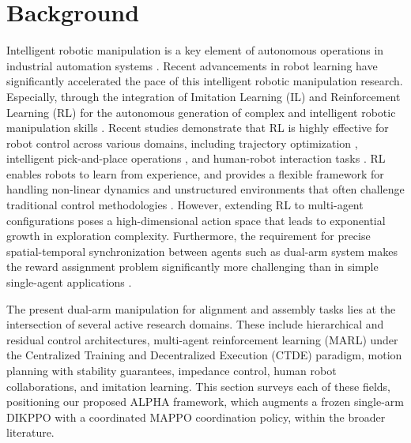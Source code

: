 \documentclass[a4paper,fleqn]{cas-dc}
\begin{document}
\section{Background}
\label{related_work}
Intelligent robotic manipulation is a key element of autonomous operations in industrial automation systems \cite{surya2025iapf}. Recent advancements in robot learning have significantly accelerated the pace of this intelligent robotic manipulation research. Especially, through the integration of Imitation Learning (IL) and Reinforcement Learning (RL) for the autonomous generation of complex and intelligent robotic manipulation skills \cite{related-28, related-29}. Recent studies demonstrate that RL is highly effective for robot control across various domains, including trajectory optimization \cite{related-30}, intelligent pick-and-place operations \cite{related-32}, and human-robot interaction tasks \cite{related-33, related-34}. RL enables robots to learn from experience, and provides a flexible framework for handling non-linear dynamics and unstructured environments that often challenge traditional control methodologies \cite{related-35}. However, extending RL to multi-agent configurations poses a high-dimensional action space that leads to exponential growth in exploration complexity. Furthermore, the requirement for precise spatial-temporal synchronization between agents such as dual-arm system makes the reward assignment problem significantly more challenging than in simple single-agent applications \cite{related-36}.     

The present dual-arm manipulation for alignment and assembly tasks lies at the intersection of several active research domains. These include hierarchical and residual control architectures, multi-agent reinforcement learning (MARL) under the Centralized Training and Decentralized Execution (CTDE) paradigm, motion planning with stability guarantees, impedance control, human robot collaborations, and imitation learning. This section surveys each of these fields, positioning our proposed ALPHA framework, which augments a frozen single-arm DIKPPO with a coordinated MAPPO coordination policy, within the broader literature.
\end{document}
